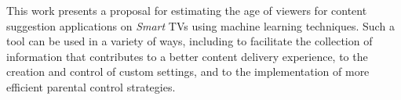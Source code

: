   This work presents a proposal for estimating the age of viewers for content suggestion applications on \emph {Smart} TVs using machine learning techniques. Such a tool can be used in a variety of ways, including to facilitate the collection of information that contributes to a better content delivery experience, to the creation and control of custom settings, and to the implementation of more efficient parental control strategies.
